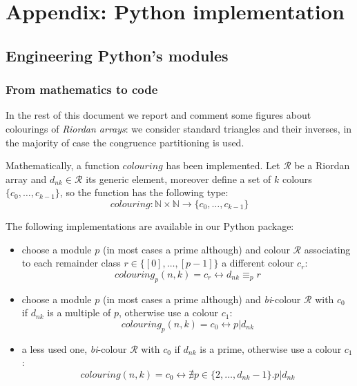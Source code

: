 \chapter{Appendix: Python implementation}

\section{Engineering Python's modules}

\subsection{From mathematics to code}
\label{subsection:python:appendix:from:math:to:code}

In the rest of this document we report and comment some figures about
colourings of \emph{Riordan arrays}: we consider standard triangles and their
inverses, in the majority of case the congruence partitioning is used.

Mathematically, a function $colouring$ has been implemented. Let $\mathcal{R}$
be a Riordan array and $d_{nk} \in \mathcal{R}$ its generic element, moreover
define a set of $k$ colours $\lbrace c_0, \ldots, c_{k-1} \rbrace$, so the
function has the following type: 
\begin{displaymath} 
    colouring : \mathbb{N} \times\mathbb{N} \rightarrow \lbrace c_0, \ldots, c_{k-1} \rbrace
\end{displaymath}

The following implementations are available in our Python package:
\begin{itemize}
    \item choose a module $p$ (in most cases a prime although) and
        colour $\mathcal{R}$ associating to each remainder class 
        $r \in \lbrace[0],\ldots,[p-1]\rbrace$
        a different colour $c_r$:
        \begin{displaymath}
            colouring_{p}(n,k) = c_{r} \leftrightarrow d_{nk} \equiv_{p} r
        \end{displaymath}
    \item choose a module $p$ (in most cases a prime although) and
        \emph{bi}-colour $\mathcal{R}$ with $c_0$ if $d_{nk}$ 
        is a multiple of $p$, otherwise use a colour $c_1$:
        \begin{displaymath}
            colouring_{p}(n,k) = c_{0} \leftrightarrow p | d_{nk}
        \end{displaymath}
    \item a less used one, \emph{bi}-colour $\mathcal{R}$ with $c_0$ 
        if $d_{nk}$ is a prime, otherwise use a colour $c_1$:
        \begin{displaymath}
            colouring(n,k) = c_{0} \leftrightarrow 
                \nexists p\in\lbrace 2,\ldots,d_{nk}-1\rbrace.p|d_{nk} 
        \end{displaymath}
\end{itemize}

